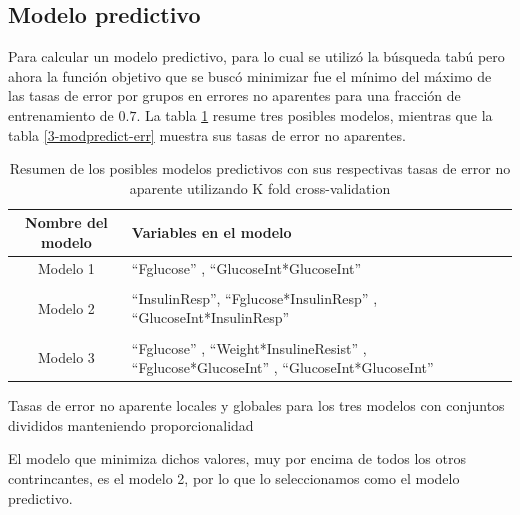 \documentclass[11pt]{article}
\begin{document}
\subsection{Modelo predictivo}
Para calcular un modelo predictivo, para lo cual se utilizó la búsqueda tabú pero ahora la función objetivo que se buscó minimizar fue el mínimo del máximo de las tasas de error por grupos en errores no aparentes para una fracción de entrenamiento de $0.7$. La tabla \ref{3-modpredict} resume tres posibles modelos, mientras que la tabla \ref{3-modpredict-err} muestra sus tasas de error no aparentes.
\begin{table}[htbp]
    \begin{center}
        \begin{tabular}{c|p{7cm}}
            \hline
            Nombre del modelo & Variables en el modelo \\
            \hline 
            Modelo 1 &``Fglucose'' , ``GlucoseInt*GlucoseInt''  \\
            & \\
            Modelo 2 & ``InsulinResp'', ``Fglucose*InsulinResp'' , ``GlucoseInt*InsulinResp''  \\
            & \\
            Modelo 3 &``Fglucose'' , ``Weight*InsulineResist'' , ``Fglucose*GlucoseInt'' , ``GlucoseInt*GlucoseInt''  \\
            \hline
            \end{tabular}
        \caption{Resumen de los posibles modelos predictivos con sus respectivas tasas de error no aparente utilizando K fold cross-validation}
        \label{3-modpredict}
    \end{center}
\end{table}

\begin{table}[H]
    \caption{Tasas de error no aparente locales y globales para los tres modelos con conjuntos divididos manteniendo proporcionalidad}
    \label{3-modpredict-err}
\end{table}
El modelo que minimiza dichos valores, muy por encima de todos los otros contrincantes, es el modelo 2, por lo que lo seleccionamos como el modelo predictivo.
\end{document}
